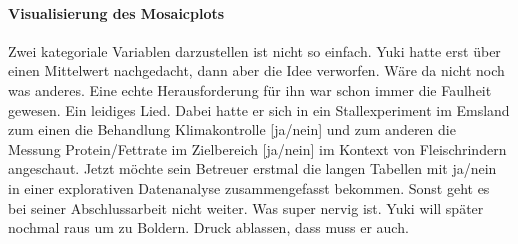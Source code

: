 \documentclass[a4paper, 9pt]{scrartcl}\usepackage[]{graphicx}\usepackage[]{xcolor}
\begin{document}
\paragraph{Visualisierung des Mosaicplots}
\fi

Zwei kategoriale Variablen darzustellen ist nicht so einfach. Yuki hatte erst über einen Mittelwert nachgedacht, dann aber die Idee verworfen. Wäre da nicht noch was anderes. Eine echte Herausforderung für ihn war schon immer die Faulheit gewesen. Ein leidiges Lied. Dabei hatte er sich in ein Stallexperiment im Emsland zum einen die Behandlung Klimakontrolle [ja/nein] und zum anderen die Messung Protein/Fettrate im Zielbereich [ja/nein] im Kontext von Fleischrindern angeschaut. Jetzt möchte sein Betreuer erstmal die langen Tabellen mit ja/nein in einer explorativen Datenanalyse zusammengefasst bekommen. Sonst geht es bei seiner Abschlussarbeit nicht weiter. Was super nervig ist. Yuki will später nochmal raus um zu Boldern. Druck ablassen, dass muss er auch.



\vspace{1Ex}
\end{document}
